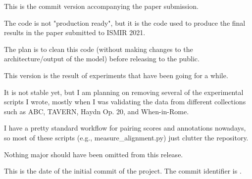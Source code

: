 This is the commit version accompanying the paper
submission.

The code is not "production ready", but it is the code used
to produce the final results in the paper submitted to ISMIR
2021.

The plan is to clean this code (without making changes to
the architecture/output of the model) before releasing to
the public.

This version is the result of experiments that have been
going for a while.

It is not stable yet, but I am planning on removing several
of the experimental scripts I wrote, mostly when I was
validating the data from different collections such as ABC,
TAVERN, Haydn Op. 20, and When-in-Rome.

I have a pretty standard workflow for pairing scores and
annotations nowadays, so most of these scripts (e.g.,
measure\_alignment.py) just clutter the repository.

Nothing major should have been omitted from this release.


This is the date of the initial commit of the project. The
commit identifier is .
